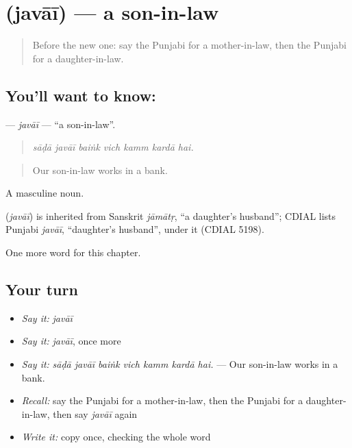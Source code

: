 \section[\texorpdfstring{\pa{ਜਵਾਈ} (javāī)}{ਜਵਾਈ (javāī)}]{ (javāī) — a son-in-law}

\label{lesson:PA-C329-javai}



\begin{quote}
Before the new one: say the Punjabi for a mother-in-law, then the Punjabi for a daughter-in-law.
\end{quote}

\subsection*{You'll want to know: }
\textbf{} — \emph{javāī} — \textquotedblleft{}a son-in-law\textquotedblright{}.

\begin{quote}
      
\end{quote}

\begin{quote}
\emph{sāḍā javāī baiṅk vich kamm kardā hai.}
\end{quote}

\begin{quote}
Our son-in-law works in a bank.
\end{quote}

A masculine noun.

\begin{cousinweb}
\textbf{} (\emph{javāī}) is inherited from Sanskrit \emph{jāmātṛ}, \textquotedblleft{}a daughter's husband\textquotedblright{}; CDIAL lists Punjabi \emph{javāī}, \textquotedblleft{}daughter's husband\textquotedblright{}, under it (CDIAL 5198).
\end{cousinweb}

\begin{grammarlens}[title={What you've built}]
One more word for this chapter.
\end{grammarlens}

\subsection*{Your turn}
\begin{itemize}
\raggedright
  \item \emph{Say it:} \emph{javāī}
  \item \emph{Say it:} \emph{javāī}, once more
  \item \emph{Say it:} \emph{sāḍā javāī baiṅk vich kamm kardā hai.} — Our son-in-law works in a bank.
  \item \emph{Recall:} say the Punjabi for a mother-in-law, then the Punjabi for a daughter-in-law, then say \emph{javāī} again
  \item \emph{Write it:} copy \textbf{} once, checking the whole word
\end{itemize}

